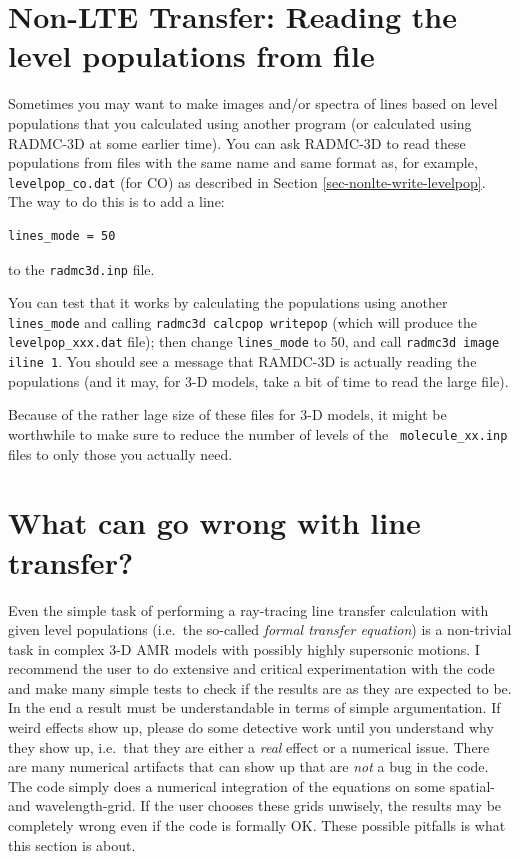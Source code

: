 \documentclass{report}
\newenvironment{asciibox}%
  {\begin{list}{}{%
    \setlength{\topsep}{0.5em}%
    \setlength{\parskip}{0em}%
    \setlength{\parsep}{0em}%
    \setlength{\itemsep}{0em}%
    \setlength{\rightmargin}{0em}%
    \setlength{\leftmargin}{3.0em}%
    \setlength{\labelsep}{1em}%
    \setlength{\labelwidth}{2em}%
  }\normalfont\footnotesize\item}
  {\end{list}}
\begin{document}
\section{Non-LTE Transfer: Reading the level populations from file}
\label{sec-nonlte-read-levelpop}
%
Sometimes you may want to make images and/or spectra of lines based on level
populations that you calculated using another program (or calculated using
RADMC-3D at some earlier time). You can ask RADMC-3D to read these
populations from files with the same name and same format as, for example,
{\small\tt levelpop\_co.dat} (for CO) as described in Section
\ref{sec-nonlte-write-levelpop}. The way to do this is to add a line:
\begin{asciibox}\begin{verbatim}
lines_mode = 50
\end{verbatim}\end{asciibox}
to the {\small\tt radmc3d.inp} file. 

You can test that it works by calculating the populations using another
{\small\tt lines\_mode} and calling {\small\tt radmc3d calcpop writepop}
(which will produce the {\small\tt levelpop\_xxx.dat} file); then change
{\small\tt lines\_mode} to 50, and call {\small\tt radmc3d image iline
  1}. You should see a message that RAMDC-3D is actually reading the
populations (and it may, for 3-D models, take a bit of time to read the
large file).

Because of the rather lage size of these files for 3-D models, it might be
worthwhile to make sure to reduce the number of levels of the {\small\tt
  molecule\_xx.inp} files to only those you actually need.


\section{What can go wrong with line transfer?}
\label{sec-lines-pitfalls}
%
Even the simple task of performing a ray-tracing line transfer calculation
with given level populations (i.e.\ the so-called {\em formal transfer
  equation}) is a non-trivial task in complex 3-D AMR models with possibly
highly supersonic motions. I recommend the user to do extensive and critical
experimentation with the code and make many simple tests to check if the
results are as they are expected to be. In the end a result must be
understandable in terms of simple argumentation. If weird effects show up,
please do some detective work until you understand why they show up, i.e.\
that they are either a {\em real} effect or a numerical issue. There are
many numerical artifacts that can show up that are {\em not} a bug in the
code. The code simply does a numerical integration of the equations on some
spatial- and wavelength-grid. If the user chooses these grids unwisely, the
results may be completely wrong even if the code is formally OK. These
possible pitfalls is what this section is about.
\end{document}

